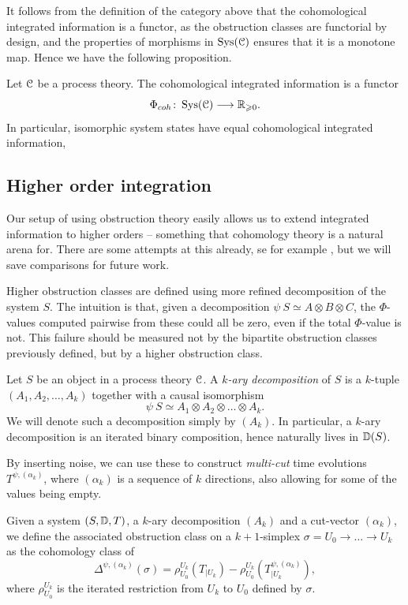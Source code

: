 It follows from the definition of the category above that the cohomological integrated information is a functor, as the obstruction classes are functorial by design, and the properties of morphisms in $\operatorname{Sys}(\EuScript{C})$ ensures that it is a monotone map. Hence we have the following proposition. 

\begin{proposition}
    \label{prop:functoriality}
    Let $\EuScript{C}$ be a process theory. The cohomological integrated information is a functor 
    \[\Phi_{coh} \colon \operatorname{Sys}(\EuScript{C}) \longrightarrow \mathbb{R}_{\geqslant 0}.\]
    In particular, isomorphic system states have equal cohomological integrated information, 
\end{proposition}

\subsection{Higher order integration}

Our setup of using obstruction theory easily allows us to extend integrated information to higher orders -- something that cohomology theory is a natural arena for. There are some attempts at this already, se for example \citeme, but we will save comparisons for future work. 

Higher obstruction classes are defined using more refined decomposition of the system $S$. The intuition is that, given a decomposition $\psi\: S\simeq A\otimes B\otimes C$, the $\Phi$-values computed pairwise from these could all be zero, even if the total $\Phi$-value is not. This failure should be measured not by the bipartite obstruction classes previously defined, but by a higher obstruction class. 

\begin{definition}
    Let $S$ be an object in a process theory $\EuScript{C}$. A \emph{$k$-ary decomposition} of $S$ is a $k$-tuple $(A_1, A_2, \ldots, A_k)$ together with a causal isomorphism 
    \[\psi \: S \simeq A_1\otimes A_2 \otimes \dots \otimes A_k.\] 
    We will denote such a decomposition simply by $(A_k)$. In particular, a $k$-ary decomposition is an iterated binary composition, hence naturally lives in $\mathbb{D}(S)$. 
\end{definition}

By inserting noise, we can use these to construct \emph{multi-cut} time evolutions $T^{\psi, (\alpha_k)}$, where $(\alpha_k)$ is a sequence of $k$ directions, also allowing for some of the values being empty.  

\begin{definition}
    Given a system $(S, \mathbb{D}, T)$, a $k$-ary decomposition $(A_k)$ and a cut-vector $(\alpha_k)$, we define the associated obstruction class on a $k+1$-simplex $\sigma = U_0\rightarrow \dots \rightarrow U_k$ as the cohomology class of
    \[\Delta^{\psi, (\alpha_k)}(\sigma) = \rho_{U_0}^{U_k}(T_{\mid U_k}) - \rho_{U_0}^{U_k}(T^{\psi, (\alpha_k)}_{\mid U_k}),\]
    where $\rho_{U_0}^{U_k}$ is the iterated restriction from $U_k$ to $U_0$ defined by $\sigma$. 
\end{definition}

